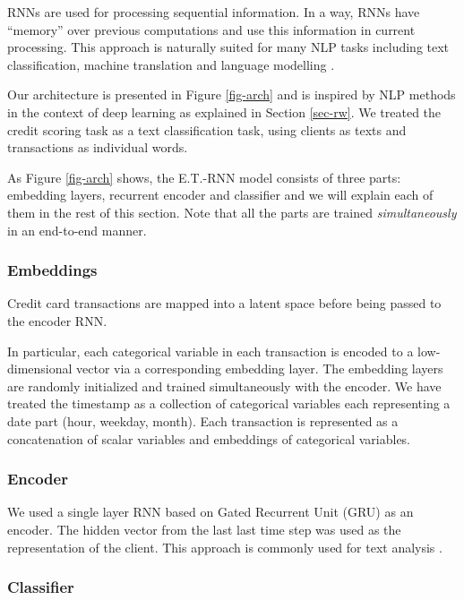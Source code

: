 \documentclass[sigconf]{acmart}
\begin{document}
RNNs are used for processing sequential information.  In a way, RNNs have “memory” over previous computations and use this information in current processing. This approach is naturally suited for many NLP tasks including text classification, machine translation and language modelling \cite{mikolov2010recurrent}.

Our architecture is presented in Figure \ref{fig-arch} and is inspired by NLP methods in the context of deep learning as explained in Section \ref{sec-rw}. We treated the credit scoring task as a text classification task, using clients as texts and transactions as individual words.

As Figure \ref{fig-arch} shows, the E.T.-RNN model consists of three parts: embedding layers, recurrent encoder and classifier and we will explain each of them in the rest of this section. Note that all the parts are trained \textit{simultaneously} in an end-to-end manner.

\subsubsection{Embeddings}

Credit card transactions are mapped into a latent space before being passed to the encoder RNN.

In particular, each categorical variable in each transaction is encoded to a low-dimensional vector via a corresponding embedding layer. The embedding layers are randomly initialized and trained simultaneously with the encoder. We have treated the timestamp as a collection of categorical variables each representing a date part (hour, weekday, month). Each transaction is represented as a concatenation of scalar variables and embeddings of categorical variables.

\subsubsection{Encoder}

We used a single layer RNN based on Gated Recurrent Unit (GRU)\cite{DBLP:journals/corr/ChoMGBSB14} as an encoder.  The hidden vector from the last last time step was used as the representation of the client. This approach is commonly used for text analysis \cite{NIPS2014_5346}.

\subsubsection{Classifier}
\end{document}
